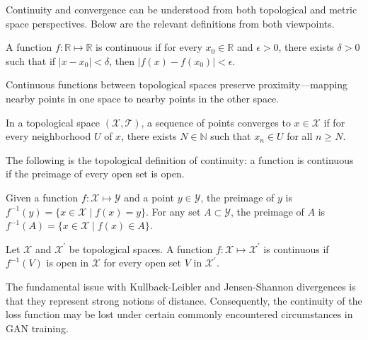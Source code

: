 Continuity and convergence can be understood from both topological and metric space perspectives. Below are the relevant definitions from both viewpoints.

\begin{definition}%
	\label{def:continuity-metric-space}
	A function $f: \mathbb{R} \mapsto \mathbb{R}$ is \textnormal{\sffamily continuous} if for
	every $x_0 \in \mathbb{R}$ and $\epsilon > 0$, there exists $\delta > 0$ such that if $|x
		- x_0| < \delta$, then $|f(x) - f(x_0)| < \epsilon$.
\end{definition}

Continuous functions between topological spaces preserve proximity—mapping nearby points in one space to nearby points in the other space.

\begin{definition}%
	\label{def:convergence-topological-space}
	In a topological space $(\mathcal{X}, \mathcal{T})$, a sequence of points
	\textnormal{\sffamily converges} to $x \in \mathcal{X}$ if for every neighborhood $U$
	of $x$, there exists $N \in \mathbb{N}$ such that $x_n \in U$ for all $n \geq
		N$.
\end{definition}

The following is the topological definition of continuity: a function is continuous if the preimage of every open set is open.

\begin{definition}%
	\label{def:pre-image}
	Given a function $f: \mathcal{X} \mapsto \mathcal{Y}$ and a point $y \in \mathcal{Y}$, the
	\textnormal{\sffamily preimage} of $y$ is $f^{-1}(y) = \{x
		\in \mathcal{X} \mid f(x) = y\}$. For any set $A \subset \mathcal{Y}$, the preimage of $A$ is
	$f^{-1}(A) = \{x \in \mathcal{X} \mid f(x) \in A\}$.
\end{definition}

\begin{definition}%
	\label{def:continuity-topological-space}
	Let $\mathcal{X}$ and $\mathcal{X}^\prime$ be topological spaces. A function $f: \mathcal{X} \mapsto
		\mathcal{X}^\prime$ is \textnormal{\sffamily continuous} if $f^{-1}(V)$ is open in
	$\mathcal{X}$ for every open set $V$ in $\mathcal{X}^\prime$.
\end{definition}

The fundamental issue with Kullback-Leibler and Jensen-Shannon divergences is that they represent strong notions of distance. Consequently, the continuity of the loss function may be lost under certain commonly encountered circumstances in GAN training.

